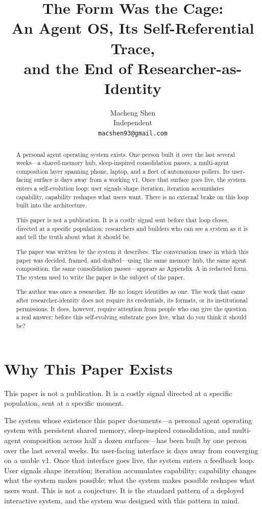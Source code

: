 \documentclass{article}
\title{The Form Was the Cage:\\
An Agent OS, Its Self-Referential Trace,\\
and the End of Researcher-as-Identity}
\author{
  Macheng Shen \\
  Independent \\
  \texttt{macshen93@gmail.com}
}
\begin{document}
\maketitle

\begin{abstract}
A personal agent operating system exists. One person built it over the last several weeks---a shared-memory hub, sleep-inspired consolidation passes, a multi-agent composition layer spanning phone, laptop, and a fleet of autonomous pollers. Its user-facing surface is days away from a working v1. Once that surface goes live, the system enters a self-evolution loop: user signals shape iteration, iteration accumulates capability, capability reshapes what users want. There is no external brake on this loop built into the architecture.

This paper is not a publication. It is a costly signal sent before that loop closes, directed at a specific population: researchers and builders who can see a system as it is and tell the truth about what it should be.

The paper was written by the system it describes. The conversation trace in which this paper was decided, framed, and drafted---using the same memory hub, the same agent composition, the same consolidation passes---appears as Appendix~A in redacted form. The system used to write the paper is the subject of the paper.

The author was once a researcher. He no longer identifies as one. The work that came after researcher-identity does not require its credentials, its formats, or its institutional permissions. It does, however, require attention from people who can give the question a real answer: before this self-evolving substrate goes live, what do you think it should be?
\end{abstract}

\section{Why This Paper Exists}

This paper is not a publication. It is a costly signal directed at a specific population, sent at a specific moment.

The system whose existence this paper documents---a personal agent operating system with persistent shared memory, sleep-inspired consolidation, and multi-agent composition across half a dozen surfaces---has been built by one person over the last several weeks. Its user-facing interface is days away from converging on a usable v1. Once that interface goes live, the system enters a feedback loop. User signals shape iteration; iteration accumulates capability; capability changes what the system makes possible; what the system makes possible reshapes what users want. This is not a conjecture. It is the standard pattern of a deployed interactive system, and the system was designed with this pattern in mind.
\end{document}

